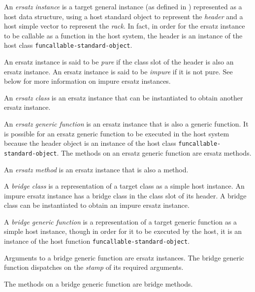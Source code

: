 \begin{definition}
An \emph{ersatz instance} is a target general instance (as defined in
) represented as a
host data structure, using a host standard object to represent the
\emph{header} and a host simple vector to represent the \emph{rack}.
In fact, in order for the ersatz instance to be callable as a function
in the host system, the header is an instance of the host class
\texttt{funcallable-standard-object}.
\end{definition}

\begin{definition}
An ersatz instance is said to be \emph{pure} if the class slot of the
header is also an ersatz instance.  An ersatz instance is said to be
\emph{impure} if it is not pure.  See below for more information on
impure ersatz instances.
\end{definition}

\begin{definition}
An \emph{ersatz class} is an ersatz instance that can be instantiated
to obtain another ersatz instance.
\end{definition}

\begin{definition}
An \emph{ersatz generic function} is an ersatz instance that is also a
generic function.  It is possible for an ersatz generic function to be
executed in the host system because the header object is an instance
of the host class \texttt{funcallable-standard-object}.  The methods
on an ersatz generic function are ersatz methods.
\end{definition}

\begin{definition}
An \emph{ersatz method} is an ersatz instance that is also a method.
\end{definition}

\begin{definition}
A \emph{bridge class} is a representation of a target class as a
simple host instance.  An impure ersatz instance has a bridge class in
the class slot of its header.  A bridge class can be instantiated to
obtain an impure ersatz instance.
\end{definition}

\begin{definition}
A \emph{bridge generic function} is a representation of a target
generic function as a simple host instance, though in order for it to
be executed by the host, it is an instance of the host function
\texttt{funcallable-standard-object}.

Arguments to a bridge generic function are ersatz instances.  The
bridge generic function dispatches on the
\emph{stamp}
 of
its required arguments.

The methods on a bridge generic function are bridge methods.
\end{definition}

